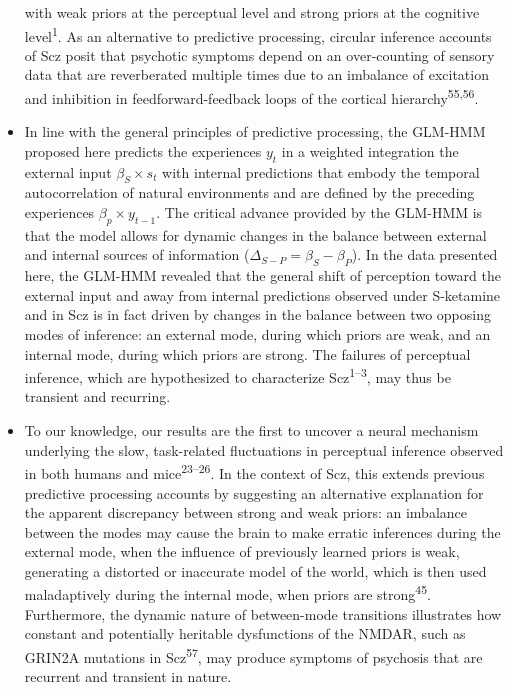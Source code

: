 \documentclass[
]{article}
\begin{document}
\begin{itemize}
  with weak priors at the perceptual level and strong priors at the
  cognitive level\textsuperscript{1}. As an alternative to predictive
  processing, circular inference accounts of Scz posit that psychotic
  symptoms depend on an over-counting of sensory data that are
  reverberated multiple times due to an imbalance of excitation and
  inhibition in feedforward-feedback loops of the cortical
  hierarchy\textsuperscript{55,56}.
\item
  In line with the general principles of predictive processing, the
  GLM-HMM proposed here predicts the experiences \(y_t\) in a weighted
  integration the external input \(\beta_S \times s_t\) with internal
  predictions that embody the temporal autocorrelation of natural
  environments and are defined by the preceding experiences
  \(\beta_p \times y_{t-1}\). The critical advance provided by the
  GLM-HMM is that the model allows for dynamic changes in the balance
  between external and internal sources of information
  (\(\Delta_{S-P} = \beta_S - \beta_P\)). In the data presented here,
  the GLM-HMM revealed that the general shift of perception toward the
  external input and away from internal predictions observed under
  S-ketamine and in Scz is in fact driven by changes in the balance
  between two opposing modes of inference: an external mode, during
  which priors are weak, and an internal mode, during which priors are
  strong. The failures of perceptual inference, which are hypothesized
  to characterize Scz\textsuperscript{1--3}, may thus be transient and
  recurring.
\item
  To our knowledge, our results are the first to uncover a neural
  mechanism underlying the slow, task-related fluctuations in perceptual
  inference observed in both humans and mice\textsuperscript{23--26}. In
  the context of Scz, this extends previous predictive processing
  accounts by suggesting an alternative explanation for the apparent
  discrepancy between strong and weak priors: an imbalance between the
  modes may cause the brain to make erratic inferences during the
  external mode, when the influence of previously learned priors is
  weak, generating a distorted or inaccurate model of the world, which
  is then used maladaptively during the internal mode, when priors are
  strong\textsuperscript{45}. Furthermore, the dynamic nature of
  between-mode transitions illustrates how constant and potentially
  heritable dysfunctions of the NMDAR, such as GRIN2A mutations in
  Scz\textsuperscript{57}, may produce symptoms of psychosis that are
  recurrent and transient in nature.
\end{itemize}
\end{document}
